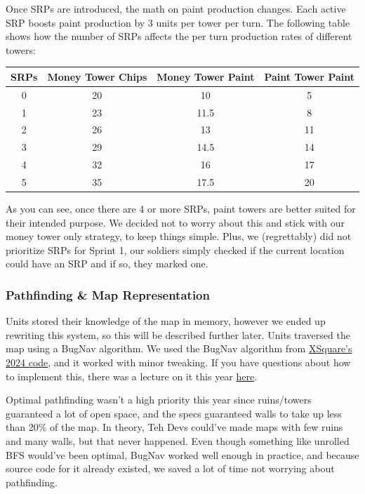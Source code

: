 Once SRPs are introduced, the math on paint production changes. Each active SRP boosts paint production by 3 units per tower per turn. The following table shows how the number of SRPs affects the per turn production rates of different towers:
\begin{center}
  \begin{tabular}{c | c | c | c}
    SRPs & Money Tower Chips & Money Tower Paint & Paint Tower Paint \\
    \hline
    0 & 20 & 10 & 5 \\
    1 & 23 & 11.5 & 8 \\
    2 & 26 & 13 & 11 \\
    3 & 29 & 14.5 & 14 \\
    4 & 32 & 16 & 17 \\
    5 & 35 & 17.5 & 20
  \end{tabular}
\end{center}
As you can see, once there are 4 or more SRPs, paint towers are better suited for their intended purpose. We decided not to worry about this and stick with our money tower only strategy, to keep things simple. Plus, we (regrettably) did not prioritize SRPs for Sprint 1, our soldiers simply checked if the current location could have an SRP and if so, they marked one.

\subsubsection{Pathfinding \& Map Representation}

Units stored their knowledge of the map in memory, however we ended up rewriting this system, so this will be described further later. Units traversed the map using a BugNav algorithm. We used the BugNav algorithm from \href{https://github.com/IvanGeffner/BTC24/blob/master/BugPath.java}{XSquare's 2024 code}, and it worked with minor tweaking. If you have questions about how to implement this, there was a lecture on it this year \href{https://www.youtube.com/live/Mqk50BQH3oQ?si=6qL5WAXmSOS2K3OR}{here}.

\medskip

Optimal pathfinding wasn't a high priority this year since ruins/towers guaranteed a lot of open space, and the specs guaranteed walls to take up less than 20\% of the map. In theory, Teh Devs could've made maps with few ruins and many walls, but that never happened. Even though something like unrolled BFS would've been optimal, BugNav worked well enough in practice, and because source code for it already existed, we saved a lot of time not worrying about pathfinding.

